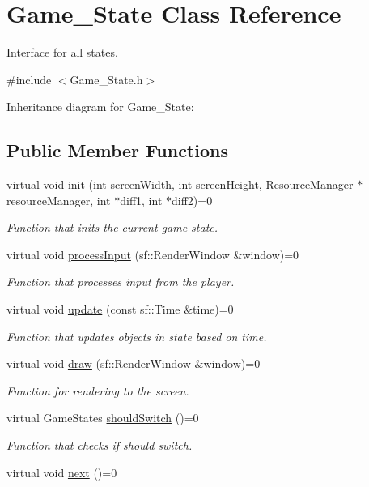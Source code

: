 \hypertarget{classGame__State}{}\section{Game\+\_\+\+State Class Reference}
\label{classGame__State}


Interface for all states.  




{\ttfamily \#include $<$Game\+\_\+\+State.\+h$>$}



Inheritance diagram for Game\+\_\+\+State\+:
\subsection*{Public Member Functions}
\begin{DoxyCompactItemize}
\item 
virtual void \hyperlink{classGame__State_a582ce3c0cddf042569bf3e08827a377c}{init} (int screen\+Width, int screen\+Height, \hyperlink{classResourceManager}{Resource\+Manager} $\ast$resource\+Manager, int $\ast$diff1, int $\ast$diff2)=0
\begin{DoxyCompactList}\small\item\em Function that inits the current game state. \end{DoxyCompactList}\item 
virtual void \hyperlink{classGame__State_ab6d698d94c4e8ec24a1ac1ca97ae3d98}{process\+Input} (sf\+::\+Render\+Window \&window)=0
\begin{DoxyCompactList}\small\item\em Function that processes input from the player. \end{DoxyCompactList}\item 
virtual void \hyperlink{classGame__State_a7e5776891b8a09f133c35dd156a7f882}{update} (const sf\+::\+Time \&time)=0
\begin{DoxyCompactList}\small\item\em Function that updates objects in state based on time. \end{DoxyCompactList}\item 
virtual void \hyperlink{classGame__State_a4db9121068121425e89170b5cb151664}{draw} (sf\+::\+Render\+Window \&window)=0
\begin{DoxyCompactList}\small\item\em Function for rendering to the screen. \end{DoxyCompactList}\item 
virtual Game\+States \hyperlink{classGame__State_aa4cca539f3f67b59c789b4528fb4d55c}{should\+Switch} ()=0
\begin{DoxyCompactList}\small\item\em Function that checks if should switch. \end{DoxyCompactList}\item 
virtual void \hyperlink{classGame__State_a4140a2b4ca08b206c6fd50e3e7818aa0}{next} ()=0\hypertarget{classGame__State_a4140a2b4ca08b206c6fd50e3e7818aa0}{}\label{classGame__State_a4140a2b4ca08b206c6fd50e3e7818aa0}


\end{DoxyCompactItemize}
